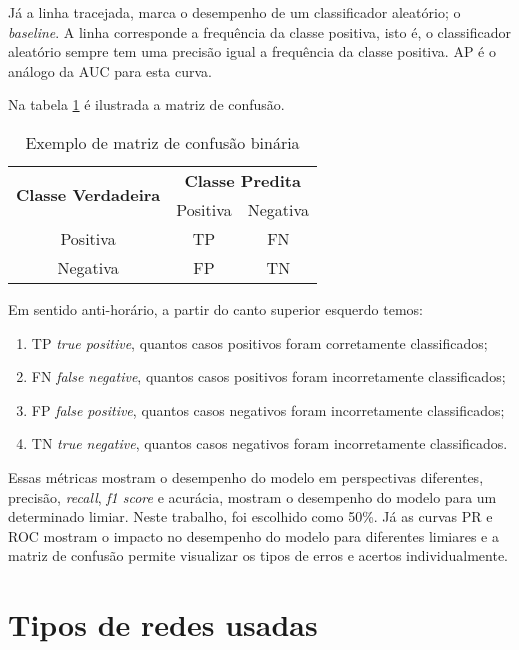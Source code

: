 Já a linha tracejada, marca o desempenho de um classificador aleatório; o \textit{baseline}. A linha corresponde a frequência da classe positiva, isto é, 
o classificador aleatório sempre tem uma precisão igual a frequência da classe positiva. AP é o análogo da AUC para esta curva.

Na tabela \ref{tab:matriz_confusao} é ilustrada a matriz de confusão.

\begin{table}[H]
\centering
\caption{Exemplo de matriz de confusão binária}
\label{tab:matriz_confusao}
\begin{tabular}{|c|c|c|}
\hline
\multirow{2}{*}{\textbf{Classe Verdadeira}} & \multicolumn{2}{c|}{\textbf{Classe Predita}} \\ \cline{2-3} 
 & Positiva & Negativa \\ \hline
Positiva & TP & FN \\ \hline
Negativa & FP & TN \\ \hline
\end{tabular}
\end{table}

Em sentido anti-horário, a partir do canto superior esquerdo temos: 

\begin{enumerate}
\item {TP} \textit{true positive}, quantos casos positivos foram corretamente classificados;
\item {FN} \textit{false negative}, quantos casos positivos foram incorretamente classificados;
\item {FP} \textit{false positive}, quantos casos negativos foram incorretamente classificados;
\item {TN} \textit{true negative}, quantos casos negativos foram incorretamente classificados.
\end{enumerate}

Essas métricas mostram o desempenho do modelo em perspectivas diferentes, 
precisão, \textit{recall}, \textit{f1 score} e acurácia, mostram o desempenho do modelo para um determinado limiar. Neste trabalho, foi escolhido como 50\%. 
Já as curvas PR e ROC mostram o impacto no desempenho do modelo para diferentes limiares e a matriz de confusão permite visualizar os tipos de erros e acertos
individualmente. 

\section{Tipos de redes usadas}
\label{sec:tipo_redes}

